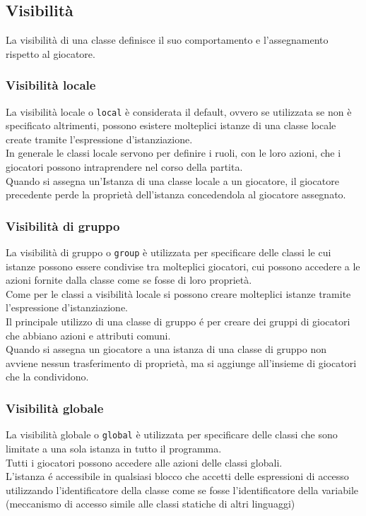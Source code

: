 \subsection{Visibilità} \label{VisibilitaClasse}
La visibilità di una classe definisce il suo comportamento e l'assegnamento rispetto al giocatore.

\subsubsection{Visibilità locale}
La visibilità locale o \lstinline|local| è considerata il default, ovvero se utilizzata se non è specificato
altrimenti, possono esistere molteplici istanze di una classe locale create tramite l'espressione d'istanziazione. \\
In generale le classi locale servono per definire i ruoli, con le loro azioni, che i giocatori possono
intraprendere nel corso della partita. \\
Quando si assegna un'Istanza di una classe locale a un giocatore, il giocatore precedente perde la proprietà dell'istanza
concedendola al giocatore assegnato.

\subsubsection{Visibilità di gruppo}
La visibilità di gruppo o \lstinline|group| è utilizzata per specificare delle classi le cui istanze possono
essere condivise tra molteplici giocatori, cui possono accedere a le azioni fornite dalla classe come 
se fosse di loro proprietà. \\
Come  per le classi a visibilità locale si possono creare molteplici istanze tramite l'espressione d'istanziazione. \\
Il principale utilizzo di una classe di gruppo é per creare dei gruppi di giocatori che abbiano
azioni e attributi comuni. \\
Quando si assegna un giocatore a una istanza di una classe di gruppo non avviene nessun trasferimento
di proprietà, ma si aggiunge all'insieme di giocatori che la condividono.

\subsubsection{Visibilità globale}
La visibilità globale o \lstinline|global| è utilizzata per specificare delle classi che sono 
limitate a una sola istanza in tutto il programma. \\
Tutti i giocatori possono accedere alle azioni delle classi globali. \\
L'istanza é accessibile in qualsiasi blocco che accetti delle espressioni di accesso utilizzando 
l'identificatore della classe come se fosse l'identificatore della variabile (meccanismo di accesso 
simile alle classi statiche di altri linguaggi)

